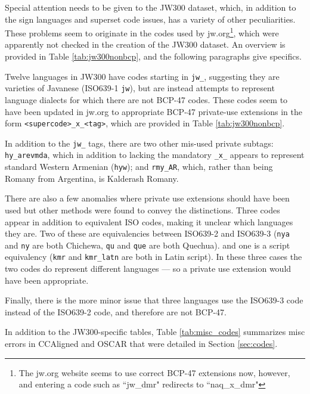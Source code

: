Special attention needs to be given to the JW300 dataset, which, in addition to the sign languages and superset code issues, has a variety of other peculiarities. These problems seem to originate in the codes used by jw.org\footnote{The jw.org website seems to use correct BCP-47 extensions now, however, and entering a code such as ``jw\_dmr" redirects to ``naq\_x\_dmr" }, which were apparently not checked in the creation of the JW300 dataset. An overview is provided in Table \ref{tab:jw300nonbcp}, and the following paragraphs give specifics.

Twelve languages in JW300 have codes starting in \texttt{jw\_}, suggesting they are varieties of Javanese (ISO639-1 \texttt{jw}), but are instead attempts to represent language dialects for which there are not BCP-47 codes. These codes seem to have been updated in jw.org to appropriate BCP-47 private-use extensions in the form \texttt{<supercode>\_x\_<tag>}, which are provided in Table \ref{tab:jw300nonbcp}.

In addition to the \texttt{jw\_} tags, there are two other mis-used private subtags: \texttt{hy\_arevmda}, which in addition to lacking the mandatory \texttt{\_x\_} appears to represent standard Western Armenian (\texttt{hyw}); and \texttt{rmy\_AR}, which, rather than being Romany from Argentina, is Kalderash Romany.

There are also a few anomalies where private use extensions should have been used but other methods were found to convey the distinctions. Three codes appear in addition to equivalent ISO codes, making it unclear which languages they are. Two of these are equivalencies between  ISO639-2 and  ISO639-3 (\texttt{nya} and \texttt{ny} are both Chichewa, \texttt{qu} and \texttt{que} are both Quechua). and one is a script equivalency (\texttt{kmr} and \texttt{kmr\_latn} are both in Latin script). In these three cases the two codes do represent different languages --- so a private use extension would have been appropriate.

Finally, there is the more minor issue that three languages use the ISO639-3 code instead of the ISO639-2 code, and therefore are not BCP-47.


In addition to the JW300-specific tables, Table \ref{tab:misc_codes} summarizes misc errors in CCAligned and OSCAR that were detailed in Section \ref{sec:codes}.

